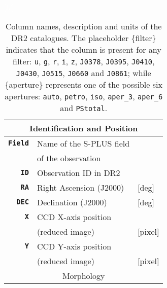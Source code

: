 \documentclass[fleqn,usenatbib]{mnras}
\begin{document}
\begin{table}\textcolor{white}{[h!]}
\caption{Column names, description and units of the DR2 catalogues. The placeholder \{filter\} indicates that the column is present for any filter: \texttt{u}, \texttt{g}, \texttt{r}, \texttt{i}, \texttt{z}, \texttt{J0378}, \texttt{J0395}, \texttt{J0410}, \texttt{J0430}, \texttt{J0515}, \texttt{J0660} and \texttt{J0861}; while \{aperture\} represents one of the possible six apertures: \texttt{auto}, \texttt{petro}, \texttt{iso}, \texttt{aper\_3}, \texttt{aper\_6} and \texttt{PStotal}.}
\centering
\label{tab:catalog_columns}
\begin{tabular}{rll}
\hline \hline

\multicolumn{3}{c}{Identification and Position} \\ \hline

\texttt{\textbf{Field}}    & Name of the S-PLUS field & \\
                           & of the observation       & \\
\texttt{\textbf{ID}}       & Observation ID in DR2    &\\
\texttt{\textbf{RA}}       & Right Ascension (J2000)  & [deg] \\
\texttt{\textbf{DEC}}      & Declination (J2000)      & [deg] \\
\texttt{\textbf{X}}        & CCD X-axis position      & \\
                           & (reduced image)          & [pixel]\\
\texttt{\textbf{Y}}        & CCD Y-axis position      & \\
                           & (reduced image)          & [pixel]\\
\hline \hline

\multicolumn{3}{c}{Morphology} \\ \hline


\end{tabular}
\end{table}
\end{document}
